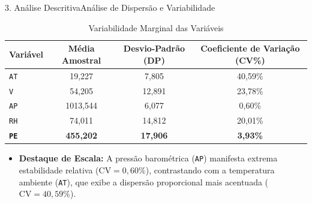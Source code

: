 \documentclass[10pt,aspectratio=169]{beamer}
\begin{document}
\begin{frame}{3. Análise Descritiva}{Análise de Dispersão e Variabilidade}
    \begin{table}
        \centering
        \caption{Variabilidade Marginal das Variáveis}
        \label{tab:dispersion}
        \small
        \begin{tabular}{lccc}
            \toprule
            \textbf{Variável} & \textbf{Média Amostral} & \textbf{Desvio-Padrão (DP)} & \textbf{Coeficiente de Variação (CV\%)} \\
            \midrule
            \texttt{AT} & 19,227  & 7,805  & 40,59\% \\
            \texttt{V}  & 54,205  & 12,891 & 23,78\% \\
            \texttt{AP} & 1013,544& 6,077  & 0,60\%  \\
            \texttt{RH} & 74,011  & 14,812 & 20,01\% \\
            \midrule
            \textbf{\texttt{PE}} & \textbf{455,202} & \textbf{17,906} & \textbf{3,93\%} \\
            \bottomrule
        \end{tabular}
    \end{table}
    \begin{itemize}
        \item \textbf{Destaque de Escala:} A pressão barométrica (\texttt{AP}) manifesta extrema estabilidade relativa ($\text{CV} = 0,60\%$), contrastando com a temperatura ambiente (\texttt{AT}), que exibe a dispersão proporcional mais acentuada ($\text{CV} = 40,59\%$).
    \end{itemize}
\end{frame}
\end{document}
